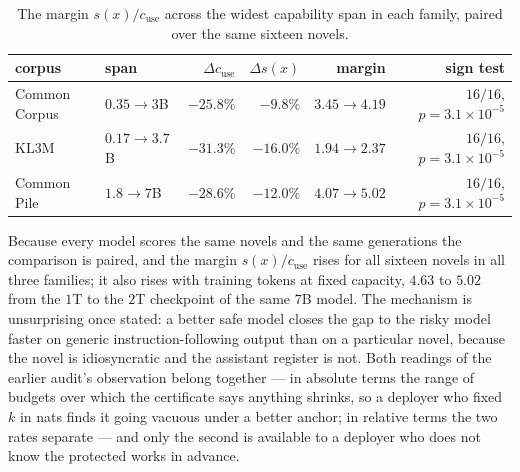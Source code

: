 \begin{table}[ht]
\centering\small
\caption{The margin $s(x)/c_{\mathrm{use}}$ across the widest capability span in each family, paired over the same sixteen novels.}\label{tab:marginspan}
\begin{tabular}{@{}llrrrr@{}}
\toprule
corpus & span & $\Delta c_{\mathrm{use}}$ & $\Delta s(x)$ & margin & sign test \\
\midrule
Common Corpus & $0.35 \to 3$B   & $-25.8\%$ & $-9.8\%$  & $3.45 \to 4.19$ & $16/16$, $p = 3.1\times10^{-5}$ \\
KL3M          & $0.17 \to 3.7$B & $-31.3\%$ & $-16.0\%$ & $1.94 \to 2.37$ & $16/16$, $p = 3.1\times10^{-5}$ \\
Common Pile   & $1.8 \to 7$B    & $-28.6\%$ & $-12.0\%$ & $4.07 \to 5.02$ & $16/16$, $p = 3.1\times10^{-5}$ \\
\bottomrule
\end{tabular}
\end{table}

Because every model scores the same novels and the same generations the comparison is paired, and the
margin $s(x)/c_{\mathrm{use}}$ rises for all sixteen novels in all three families; it also rises with
training tokens at fixed capacity, $4.63$ to $5.02$ from the $1$T to the $2$T checkpoint of the same
$7$B model. The mechanism is unsurprising once stated: a better safe model closes the gap to the
risky model faster on generic instruction-following output than on a particular novel, because the
novel is idiosyncratic and the assistant register is not. Both readings of the earlier audit's
observation belong together --- in absolute terms the range of budgets over which the certificate
says anything shrinks, so a deployer who fixed $k$ in nats finds it going vacuous under a better
anchor; in relative terms the two rates separate --- and only the second is available to a deployer
who does not know the protected works in advance.


